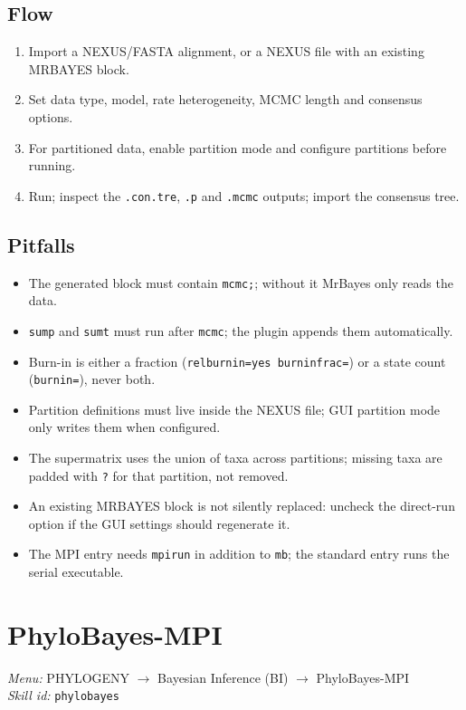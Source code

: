 \documentclass[11pt]{report}
\begin{document}
\subsection{Flow}

\begin{enumerate}
  \item Import a NEXUS/FASTA alignment, or a NEXUS file with an existing MRBAYES block.
  \item Set data type, model, rate heterogeneity, MCMC length and consensus options.
  \item For partitioned data, enable partition mode and configure partitions before running.
  \item Run; inspect the \texttt{.\allowbreak con.\allowbreak tre}, \texttt{.\allowbreak p} and \texttt{.\allowbreak mcmc} outputs; import the consensus tree.
\end{enumerate}

\subsection{Pitfalls}

\begin{itemize}
  \item The generated block must contain \texttt{mcmc;}; without it MrBayes only reads the data.
  \item \texttt{sump} and \texttt{sumt} must run after \texttt{mcmc}; the plugin appends them automatically.
  \item Burn-in is either a fraction (\texttt{relburnin=yes burninfrac=}) or a state count (\texttt{burnin=}), never both.
  \item Partition definitions must live inside the NEXUS file; GUI partition mode only writes them when configured.
  \item The supermatrix uses the union of taxa across partitions; missing taxa are padded with \texttt{?} for that partition, not removed.
  \item An existing MRBAYES block is not silently replaced: uncheck the direct-run option if the GUI settings should regenerate it.
  \item The MPI entry needs \texttt{mpirun} in addition to \texttt{mb}; the standard entry runs the serial executable.
\end{itemize}


\section{PhyloBayes-MPI}
\noindent\textit{Menu:} PHYLOGENY $\rightarrow$ Bayesian Inference (BI) $\rightarrow$ PhyloBayes-MPI\\
\noindent\textit{Skill id:} \texttt{phylobayes}
\end{document}
